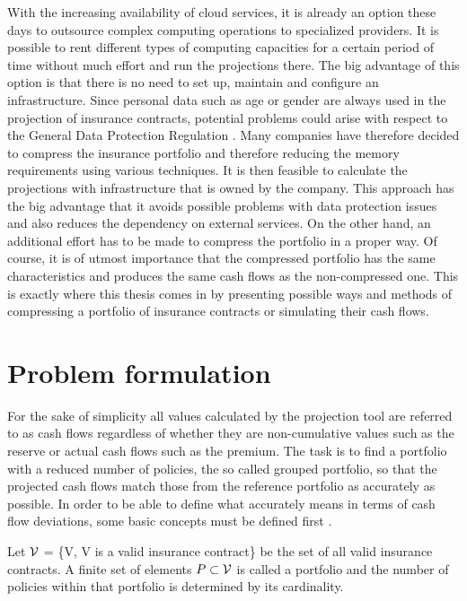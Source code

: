 With the increasing availability of cloud services, it is already an option these days to outsource complex computing operations to specialized providers. It is possible to rent different types of computing capacities for a certain period of time without much effort and run the projections there. The big advantage of this option is that there is no need to set up, maintain and configure an infrastructure. Since personal data such as age or gender are always used in the projection of insurance contracts, potential problems could arise with respect to the General Data Protection Regulation \cite{datenschutz}. Many companies have therefore decided to compress the insurance portfolio and therefore reducing the memory requirements using various techniques. It is then feasible to calculate the projections with infrastructure that is owned by the company. This approach has the big advantage that it avoids possible problems with data protection issues and also reduces the dependency on external services. On the other hand, an additional effort has to be made to compress the portfolio in a proper way. Of course, it is of utmost importance that the compressed portfolio has the same characteristics and produces the same cash flows as the non-compressed one. This is exactly where this thesis comes in by presenting possible ways and methods of compressing a portfolio of insurance contracts or simulating their cash flows.

\section{Problem formulation}
For the sake of simplicity all values calculated by the projection tool are referred to as cash flows regardless of whether they are non-cumulative values such as the reserve or actual cash flows such as the premium. The task is to find a portfolio with a reduced number of policies, the so called grouped portfolio, so that the projected cash flows match those from the reference  portfolio as accurately as possible. In order to be able to define what accurately means in terms of cash flow deviations, some basic concepts must be defined first . 

\begin{definition}
	Let $\mathcal{V}$ = \{V, V is a valid insurance contract\} be the set of all valid insurance contracts. A finite set of elements $P \subset \mathcal{V}$ is called a portfolio and the number of policies within that portfolio is determined by its cardinality.
\end{definition}

